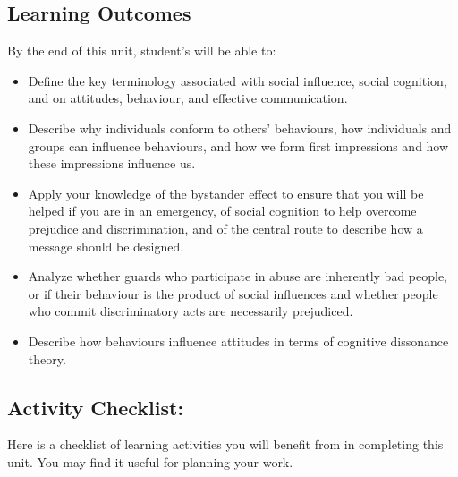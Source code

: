 \documentclass[
]{book}
\providecommand{\tightlist}{%
  \setlength{\itemsep}{0pt}\setlength{\parskip}{0pt}}
\begin{document}
\hypertarget{learning-outcomes-6}{%
\subsection*{Learning Outcomes}\label{learning-outcomes-6}}

By the end of this unit, student's will be able to:

\begin{itemize}
\tightlist
\item
  Define the key terminology associated with social influence, social cognition, and on attitudes, behaviour, and effective communication.\\
\item
  Describe why individuals conform to others' behaviours, how individuals and groups can influence behaviours, and how we form first impressions and how these impressions influence us.\\
\item
  Apply your knowledge of the bystander effect to ensure that you will be helped if you are in an emergency, of social cognition to help overcome prejudice and discrimination, and of the central route to describe how a message should be designed.\\
\item
  Analyze whether guards who participate in abuse are inherently bad people, or if their behaviour is the product of social influences and whether people who commit discriminatory acts are necessarily prejudiced.\\
\item
  Describe how behaviours influence attitudes in terms of cognitive dissonance theory.
\end{itemize}

\hypertarget{activity-checklist-6}{%
\subsection*{Activity Checklist:}\label{activity-checklist-6}}

Here is a checklist of learning activities you will benefit from in completing this unit. You may find it useful for planning your work.
\end{document}
